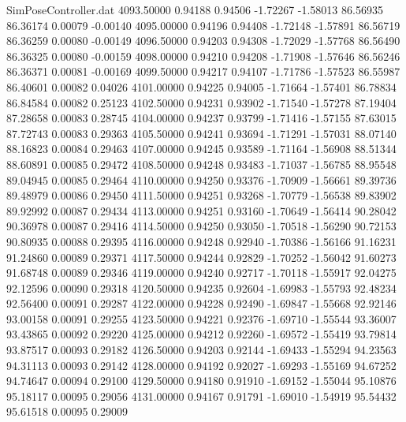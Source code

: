 \begin{filecontents}{SimPoseController.dat}
4093.50000    0.94188    0.94506    -1.72267   -1.58013   86.56935   86.36174    0.00079   -0.00140
4095.00000    0.94196    0.94408    -1.72148   -1.57891   86.56719   86.36259    0.00080   -0.00149
4096.50000    0.94203    0.94308    -1.72029   -1.57768   86.56490   86.36325    0.00080   -0.00159
4098.00000    0.94210    0.94208    -1.71908   -1.57646   86.56246   86.36371    0.00081   -0.00169
4099.50000    0.94217    0.94107    -1.71786   -1.57523   86.55987   86.40601    0.00082    0.04026
4101.00000    0.94225    0.94005    -1.71664   -1.57401   86.78834   86.84584    0.00082    0.25123
4102.50000    0.94231    0.93902    -1.71540   -1.57278   87.19404   87.28658    0.00083    0.28745
4104.00000    0.94237    0.93799    -1.71416   -1.57155   87.63015   87.72743    0.00083    0.29363
4105.50000    0.94241    0.93694    -1.71291   -1.57031   88.07140   88.16823    0.00084    0.29463
4107.00000    0.94245    0.93589    -1.71164   -1.56908   88.51344   88.60891    0.00085    0.29472
4108.50000    0.94248    0.93483    -1.71037   -1.56785   88.95548   89.04945    0.00085    0.29464
4110.00000    0.94250    0.93376    -1.70909   -1.56661   89.39736   89.48979    0.00086    0.29450
4111.50000    0.94251    0.93268    -1.70779   -1.56538   89.83902   89.92992    0.00087    0.29434
4113.00000    0.94251    0.93160    -1.70649   -1.56414   90.28042   90.36978    0.00087    0.29416
4114.50000    0.94250    0.93050    -1.70518   -1.56290   90.72153   90.80935    0.00088    0.29395
4116.00000    0.94248    0.92940    -1.70386   -1.56166   91.16231   91.24860    0.00089    0.29371
4117.50000    0.94244    0.92829    -1.70252   -1.56042   91.60273   91.68748    0.00089    0.29346
4119.00000    0.94240    0.92717    -1.70118   -1.55917   92.04275   92.12596    0.00090    0.29318
4120.50000    0.94235    0.92604    -1.69983   -1.55793   92.48234   92.56400    0.00091    0.29287
4122.00000    0.94228    0.92490    -1.69847   -1.55668   92.92146   93.00158    0.00091    0.29255
4123.50000    0.94221    0.92376    -1.69710   -1.55544   93.36007   93.43865    0.00092    0.29220
4125.00000    0.94212    0.92260    -1.69572   -1.55419   93.79814   93.87517    0.00093    0.29182
4126.50000    0.94203    0.92144    -1.69433   -1.55294   94.23563   94.31113    0.00093    0.29142
4128.00000    0.94192    0.92027    -1.69293   -1.55169   94.67252   94.74647    0.00094    0.29100
4129.50000    0.94180    0.91910    -1.69152   -1.55044   95.10876   95.18117    0.00095    0.29056
4131.00000    0.94167    0.91791    -1.69010   -1.54919   95.54432   95.61518    0.00095    0.29009

\end{filecontents}
